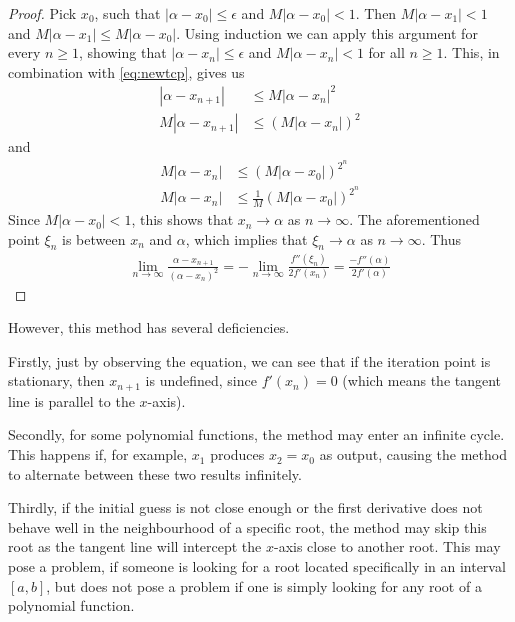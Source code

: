 \documentclass[
  digital, %
  table,   %
  nolof,     %
  nolot,     %
	draft, %
]{fithesis3}
\begin{document}
\begin{proof}
Pick $x_{0}$, such that $\left|\alpha-x_{0}\right| \leq \epsilon$ and $M\left|\alpha-x_{0}\right| < 1$\parencite[p.~61]{rootApproxMeth}. Then $M\left|\alpha - x_{1}\right| < 1$ and $M\left|\alpha - x_{1}\right| \leq M\left|\alpha - x_{0}\right|$. Using induction we can apply this argument for every $n \geq 1$, showing that $\left|\alpha-x_{n}\right| \leq \epsilon$ and $M\left|\alpha-x_{n}\right| < 1$ for all $n \geq 1$.
This, in combination with \eqref{eq:newtcp}, gives us
\begin{align}
  \left|\alpha - x_{n+1}\right| &\leq M\left|\alpha - x_{n}\right|^2 \\
	M\left|\alpha - x_{n+1}\right| &\leq (M\left|\alpha - x_{n}\right|)^2 
\end{align}
and
\begin{align}
  M\left|\alpha - x_{n}\right| &\leq (M\left|\alpha - x_{0}\right|)^{2^n} \\
	M\left|\alpha - x_{n}\right| &\leq \frac{1}{M}(M\left|\alpha - x_{0}\right|)^{2^n}
\end{align}
Since $M\left|\alpha-x_{0}\right| < 1$, this shows that $x_{n}\rightarrow\alpha$ as $n\rightarrow\infty$.
The aforementioned point $\xi_{n}$ is between $x_{n}$ and $\alpha$, which implies that $\xi_{n}\rightarrow\alpha$ as $n\rightarrow\infty$. Thus \parencite[p.~61]{rootApproxMeth}
\begin{align}
 \lim_{n\to\infty} \frac{\alpha - x_{n+1}}{(\alpha - x_{n})^2} = -\lim_{n\to\infty} \frac{f''(\xi_{n})}{2f'(x_{n})} = \frac{-f''(\alpha)}{2f'(\alpha)}
\end{align}
\end{proof}
However, this method has several deficiencies.

Firstly, just by observing the equation, we can see that if the iteration point is stationary, then $x_{n+1}$ is undefined, since $f'(x_{n}) = 0$ (which means the tangent line is parallel to the $x$-axis). 

Secondly, for some polynomial functions, the method may enter an infinite cycle. This happens if, for example, $x_{1}$ produces $x_{2} = x_{0}$ as output, causing the method to alternate between these two results infinitely.

Thirdly, if the initial guess is not close enough or the first derivative does not behave well in the neighbourhood of a specific root, the method may skip this root as the tangent line will intercept the $x$-axis close to another root. This may pose a problem, if someone is looking for a root located specifically in an interval $[a,b]$, but does not pose a problem if one is simply looking for any root of a polynomial function.
\end{document}
